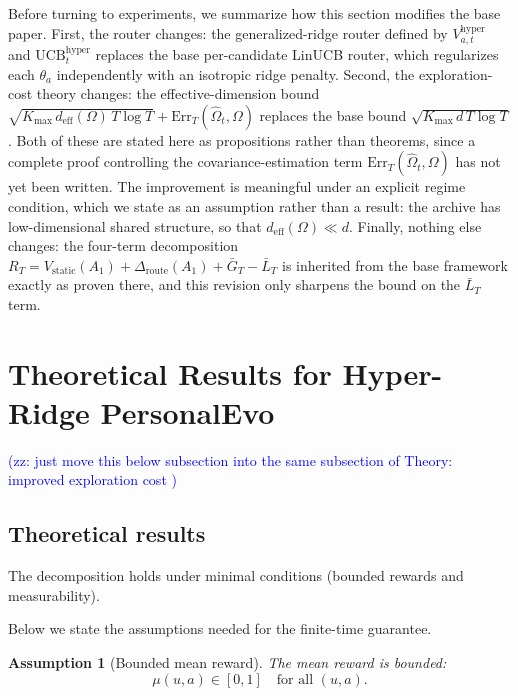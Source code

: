 \documentclass{article} %
\newtheorem{assumption}{Assumption}
\providecommand{\zz}[1]{\textcolor{blue}{(zz: #1)}}
\providecommand{\Rstatic}{V_{\mathrm{static}}}
\providecommand{\Droute}{\Delta_{\mathrm{route}}}
\providecommand{\deff}{d_{\mathrm{eff}}}
\providecommand{\Err}{\mathrm{Err}}
\providecommand{\Kmax}{K_{\max}}
\begin{document}
Before turning to experiments, we summarize how this section modifies the base
paper. First, the router changes: the generalized-ridge router defined by
$V_{a,t}^{\mathrm{hyper}}$ and $\mathrm{UCB}_t^{\mathrm{hyper}}$ replaces the
base per-candidate LinUCB router, which regularizes each $\theta_a$
independently with an isotropic ridge penalty. Second, the exploration-cost
theory changes: the effective-dimension bound
$\sqrt{\Kmax\, \deff(\Omega)\, T \log T} + \Err_T(\widehat{\Omega}_t, \Omega)$
replaces the base bound $\sqrt{\Kmax\, d\, T \log T}$. Both of these are
stated here as propositions rather than theorems, since a complete proof
controlling the covariance-estimation term
$\Err_T(\widehat{\Omega}_t, \Omega)$ has not yet been written. The improvement
is meaningful under an explicit regime condition, which we state as an
assumption rather than a result: the archive has low-dimensional shared
structure, so that $\deff(\Omega) \ll d$. Finally, nothing else changes: the
four-term decomposition
$R_T = \Rstatic(A_1) + \Droute(A_1) + \bar{G}_T - \bar{L}_T$ is inherited from
the base framework exactly as proven there, and this revision only sharpens
the bound on the $\bar{L}_T$ term.

\section{Theoretical Results for Hyper-Ridge PersonalEvo}
\label{sec:hyper-theory}



\zz{just move this below subsection into the same subsection of Theory: improved exploration cost }
\subsection{Theoretical results}

\label{sec:method-assump}

The decomposition holds under minimal conditions (bounded rewards and measurability).

Below we state the assumptions needed for the finite-time guarantee.

\begin{assumption}[Bounded mean reward]
\label{ass:bounded}
The mean reward is bounded:
\begin{equation}
\label{eq:ass-bounded}
\mu(u,a) \in [0,1] \quad \text{for all } (u,a).
\end{equation}
\end{assumption}
\end{document}
